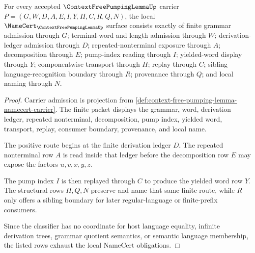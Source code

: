\begin{theorem}
\label{thm:context-free-pumping-lemma-namecert-obligations}
For every accepted $\ContextFreePumpingLemmaUp$ carrier $P=(G,W,D,A,E,I,Y,H,C,R,Q,N)$, the local $\NameCert_{\ContextFreePumpingLemmaUp}$ surface consists exactly of finite grammar admission through $G$; terminal-word and length admission through $W$; derivation-ledger admission through $D$; repeated-nonterminal exposure through $A$; decomposition through $E$; pump-index reading through $I$; yielded-word display through $Y$; componentwise transport through $H$; replay through $C$; sibling language-recognition boundary through $R$; provenance through $Q$; and local naming through $N$.
\end{theorem}
\begin{proof}
Carrier admission is projection from \autoref{def:context-free-pumping-lemma-namecert-carrier}. The finite packet displays the grammar, word, derivation ledger, repeated nonterminal, decomposition, pump index, yielded word, transport, replay, consumer boundary, provenance, and local name.

The positive route begins at the finite derivation ledger $D$. The repeated nonterminal row $A$ is read inside that ledger before the decomposition row $E$ may expose the factors $u,v,x,y,z$.

The pump index $I$ is then replayed through $C$ to produce the yielded word row $Y$. The structural rows $H,Q,N$ preserve and name that same finite route, while $R$ only offers a sibling boundary for later regular-language or finite-prefix consumers.

Since the classifier has no coordinate for host language equality, infinite derivation trees, grammar quotient semantics, or semantic language membership, the listed rows exhaust the local NameCert obligations.
\end{proof}

